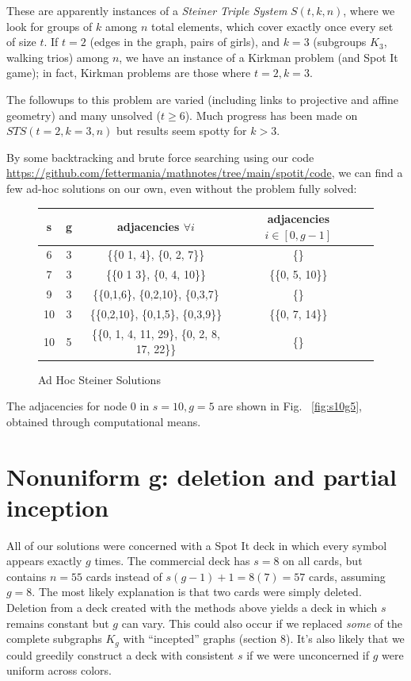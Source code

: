 \documentclass[11pt, oneside]{article} 	%
\begin{document}
These are apparently instances of a \emph{Steiner Triple System} $S(t, k, n)$\cite{6}, where we look for groups of $k$ among $n$ total elements, which cover exactly once every set of size $t$. If $t=2$ (edges in the graph, pairs of girls), and $k=3$ (subgroups $K_3$, walking trios) among $n$, we have an instance of a Kirkman problem (and Spot It game); in fact, Kirkman problems are those where $t=2, k=3$.

The followups to this problem are varied (including links to projective and affine geometry) and many unsolved ($t \geq 6$). Much progress has been made on $STS(t=2,k=3,n)$ but results seem spotty for $k>3$.

By some backtracking and brute force searching using our code \url{https://github.com/fettermania/mathnotes/tree/main/spotit/code}, we can find a few ad-hoc solutions on our own, even without the problem fully solved:



\begin{figure}[!htb]
\centering
 \centering
 \begin{tabular}{c c | c c c}
  s & g & adjacencies $\forall i$ & adjacencies $i \in [0, g-1]$ \\
\hline
  6 & 3 & \{\{0 1, 4\}, \{0, 2, 7\}\} & \{\}\\
  7 & 3 & \{\{0 1 3\}, \{0, 4, 10\}\} & \{\{0, 5, 10\}\} \\
  9 & 3 & \{\{0,1,6\}, \{0,2,10\}, \{0,3,7\} & \{\} \\
  10 & 3 & \{\{0,2,10\}, \{0,1,5\}, \{0,3,9\}\} & \{\{0, 7, 14\}\} \\
  10 & 5 & \{\{0, 1, 4, 11, 29\}, \{0, 2, 8, 17, 22\}\} & \{\} \\
  \end{tabular}
 \caption{Ad Hoc Steiner Solutions }
\label{fig:ad-hoc-steiner}
\end{figure}

The adjacencies for node 0 in $s=10, g=5$ are shown in Fig. ~\ref{fig:s10g5}, obtained through computational means.

\section{Nonuniform g: deletion and partial inception}

All of our solutions were concerned with a Spot It deck in which every symbol appears exactly $g$ times. The commercial deck has $s=8$ on all cards, but contains $n=55$ cards instead of $s(g-1) +1 = 8(7) = 57$ cards, assuming $g=8$. The most likely explanation is that two cards were simply deleted. Deletion from a deck created with the methods above yields a deck in which $s$ remains constant but $g$ can vary. This could also occur if we replaced \emph{some} of the complete subgraphs $K_g$ with ``incepted'' graphs (section 8). It's also likely that we could greedily construct a deck with consistent $s$ if we were unconcerned if $g$ were uniform across colors.
\end{document}
